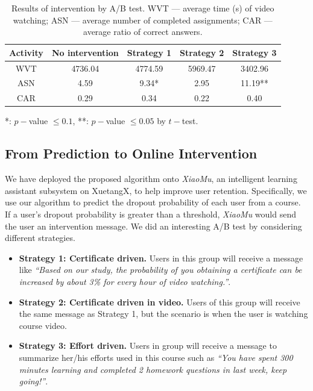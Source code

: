 	
\begin{table}
		\centering
	\caption{Results of intervention by A/B test. WVT --- average time (s) of video watching; ASN --- average number of completed assignments; CAR --- average ratio of correct answers.} 
	\setlength{\tabcolsep}{0.7mm}
	\begin{tabular}{c|c|c|c|c}
		\hline
		\hline
	    Activity & No intervention & Strategy 1 & Strategy 2 &Strategy 3 \\
		\hline
		WVT & 4736.04 & 4774.59 & 5969.47 &3402.96\\
		\hline
	    ASN& 4.59 & 9.34* & 2.95 &11.19**\\
	    \hline
	    CAR & 0.29 & 0.34 & 0.22 &0.40\\
		\hline		
		\hline
	\end{tabular}
	*: $p-$value $\le 0.1$, **: $p-$value $\le 0.05$ by $t-$test.
	\label{tab:t-test}
\end{table}

	\subsection{From Prediction to Online Intervention}
	We have deployed the proposed algorithm onto \textit{XiaoMu}, an intelligent learning assistant subsystem on XuetangX, to help improve user retention. 
	 Specifically, we use our algorithm to predict the dropout probability of each user from a course.
	 If a user's dropout probability is greater than a threshold, 
	 \textit{XiaoMu} would send the user an intervention message.
	 We did an interesting A/B test by considering different strategies.
	 \begin{itemize}
	 	 \item \textbf{Strategy 1: Certificate driven.} Users in this group will receive a message like \emph{``Based on our study, the probability of you obtaining a certificate can be increased by about 3\% for every hour of video watching.''}.%
	 	 
	 	\item \textbf{Strategy 2: Certificate driven in video.} Users of this group will receive the same message as Strategy 1, but the scenario is 
	 	when the user is watching course video.
	 	
	 	\item \textbf{Strategy 3: Effort driven.} Users in group will receive a message to summarize her/his efforts used in this course such as
	 	\emph{``You have spent 300 minutes learning and completed 2 homework questions in last week, keep going!''}.%
	 	\end{itemize}
 	
